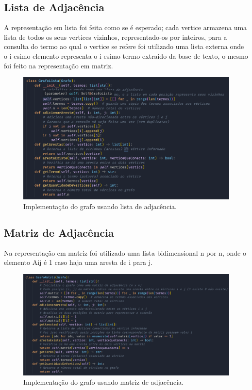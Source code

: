 \documentclass[12pt]{article}
\begin{document}
\subsection{Lista de Adjacência}
A representação em lista foi feita como se é esperado; cada vertice armazena uma lista de todos os seus vertices vizinhos, representado-os por inteiros, para a consulta do termo ao qual o vertice se refere foi utilizado uma lista externa onde o i-esimo elemento representa o i-esimo termo extraido da base de texto, o mesmo foi feito na representação em matriz. 

\begin{figure}[H]
    \centering
    \includegraphics[width=1\textwidth]{grafoLista.png}
    \caption{Implementação do grafo usando lista de adjacência.}
\end{figure}

\subsection{Matriz de Adjacência}
Na representação em matriz foi utilizado uma lista bidimensional n por n, onde o elemento Aij é 1 caso haja uma aresta de i para j.

\begin{figure}[H]
    \centering
    \includegraphics[width=1\textwidth]{grafoMatriz.png}
    \caption{Implementação do grafo usando matriz de adjacência.}
\end{figure}
\end{document}
